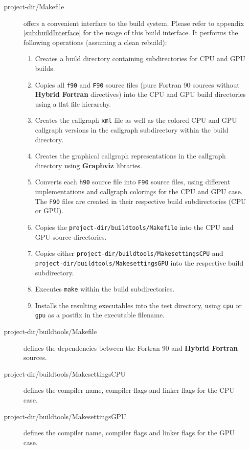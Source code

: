 \begin{description}
 \item[project-dir/Makefile] offers a convenient interface to the build system. Please refer to appendix \ref{sub:buildInterface} for the usage of this build interface. It performs the following operations (assuming a clean rebuild):
 \begin{enumerate}
  \item Creates a build directory containing subdirectories for CPU and GPU builds.
  \item Copies all \verb|f90| and \verb|F90| source files (pure Fortran 90 sources without \textbf{Hybrid Fortran} directives) into the CPU and GPU build directories using a flat file hierarchy. 
  \item Creates the callgraph \verb|xml| file as well as the colored CPU and GPU callgraph versions in the callgraph subdirectory within the build directory.
  \item Creates the graphical callgraph representations in the callgraph directory using \textbf{Graphviz} libraries.
  \item Converts each \verb|h90| source file into \verb|F90| source files, using different implementations and callgraph colorings for the CPU and GPU case. The \verb|F90| files are created in their respective build subdirectories (CPU or GPU).
  \item Copies the \verb|project-dir/buildtools/Makefile| into the CPU and GPU source directories.
  \item Copies either \verb|project-dir/buildtools/MakesettingsCPU| and \linebreak
    \verb|project-dir/buildtools/MakesettingsGPU| into the respective build subdirectory.
  \item Executes \verb|make| within the build subdirectories.
  \item Installs the resulting executables into the test directory, using \verb|cpu| or \verb|gpu| as a postfix in the executable filename.
 \end{enumerate}
 \item[project-dir/buildtools/Makefile] defines the dependencies between the Fortran 90 and \textbf{Hybrid Fortran} sources. 
 \item[project-dir/buildtools/MakesettingsCPU] defines the compiler name, compiler flags and linker flags for the CPU case.
 \item[project-dir/buildtools/MakesettingsGPU] defines the compiler name, compiler flags and linker flags for the GPU case.
\end{description}

